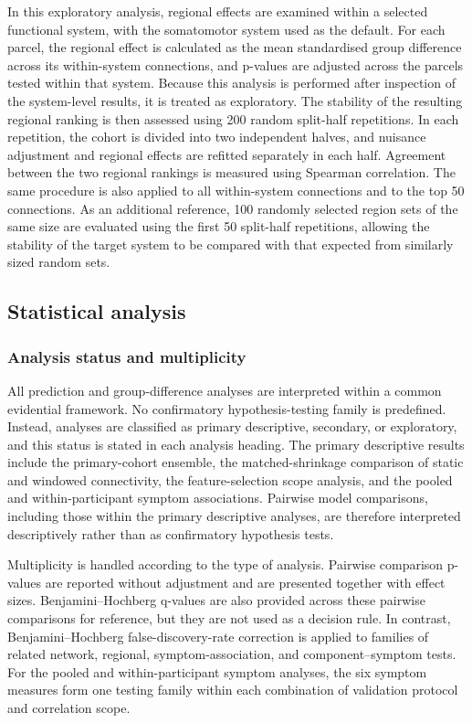 In this exploratory analysis, regional effects are examined within a selected functional system, with the somatomotor system used as the default. For each parcel, the regional effect is calculated as the mean standardised group difference across its within-system connections, and p-values are adjusted across the parcels tested within that system. Because this analysis is performed after inspection of the system-level results, it is treated as exploratory. The stability of the resulting regional ranking is then assessed using 200 random split-half repetitions. In each repetition, the cohort is divided into two independent halves, and nuisance adjustment and regional effects are refitted separately in each half. Agreement between the two regional rankings is measured using Spearman correlation. The same procedure is also applied to all within-system connections and to the top 50 connections. As an additional reference, 100 randomly selected region sets of the same size are evaluated using the first 50 split-half repetitions, allowing the stability of the target system to be compared with that expected from similarly sized random sets.

\subsection{Statistical analysis}
\label{subsec:statistical-analysis}

\subsubsection{Analysis status and multiplicity}
\label{subsubsec:analysis-status}

All prediction and group-difference analyses are interpreted within a common evidential framework. No confirmatory hypothesis-testing family is predefined. Instead, analyses are classified as primary descriptive, secondary, or exploratory, and this status is stated in each analysis heading. The primary descriptive results include the primary-cohort ensemble, the matched-shrinkage comparison of static and windowed connectivity, the feature-selection scope analysis, and the pooled and within-participant symptom associations. Pairwise model comparisons, including those within the primary descriptive analyses, are therefore interpreted descriptively rather than as confirmatory hypothesis tests.

Multiplicity is handled according to the type of analysis. Pairwise comparison p-values are reported without adjustment and are presented together with effect sizes. Benjamini--Hochberg q-values are also provided across these pairwise comparisons for reference, but they are not used as a decision rule. In contrast, Benjamini--Hochberg false-discovery-rate correction is applied to families of related network, regional, symptom-association, and component--symptom tests. For the pooled and within-participant symptom analyses, the six symptom measures form one testing family within each combination of validation protocol and correlation scope.


